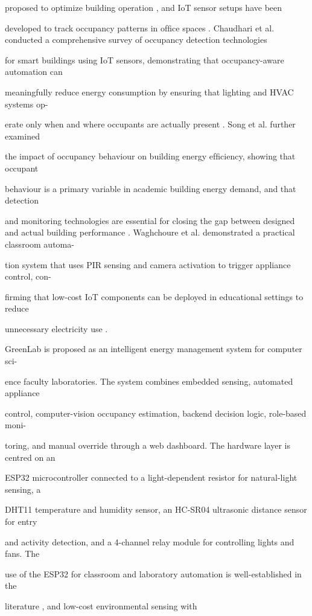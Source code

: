 proposed to optimize building operation \cite{mo2019}, and IoT sensor setups have been

developed to track occupancy patterns in ofﬁce spaces \cite{li2019}. Chaudhari et al. conducted a comprehensive survey of occupancy detection technologies

for smart buildings using IoT sensors, demonstrating that occupancy-aware automation can

meaningfully reduce energy consumption by ensuring that lighting and HVAC systems op-

erate only when and where occupants are actually present \cite{chaudhari2024}. Song et al. further examined

the impact of occupancy behaviour on building energy efﬁciency, showing that occupant

behaviour is a primary variable in academic building energy demand, and that detection

and monitoring technologies are essential for closing the gap between designed and actual building performance \cite{song2024}. Waghchoure et al. demonstrated a practical classroom automa-

tion system that uses PIR sensing and camera activation to trigger appliance control, con-

ﬁrming that low-cost IoT components can be deployed in educational settings to reduce

unnecessary electricity use \cite{waghchoure2025}.

GreenLab is proposed as an intelligent energy management system for computer sci-

ence faculty laboratories. The system combines embedded sensing, automated appliance

control, computer-vision occupancy estimation, backend decision logic, role-based moni-

toring, and manual override through a web dashboard. The hardware layer is centred on an

ESP32 microcontroller connected to a light-dependent resistor for natural-light sensing, a

DHT11 temperature and humidity sensor, an HC-SR04 ultrasonic distance sensor for entry

and activity detection, and a 4-channel relay module for controlling lights and fans. The

use of the ESP32 for classroom and laboratory automation is well-established in the

literature \cite{ingole2024,anderson2024}, and low-cost environmental sensing with

